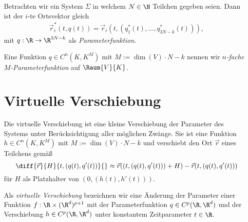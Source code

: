 \documentclass[../main.tex]{subfiles}
\begin{document}
	Betrachten wir ein System $\Sigma$ in welchem $N\in\N$ Teilchen gegeben seien. Dann ist der $i$-te Ortsvektor gleich 
	\begin{align*}
		\vec{r}_i^*(t,q(t))=\vec{r}_i(t,(q_1^*(t),\dots,q_{3N-k}^*(t))),
	\end{align*}
	mit $q:\R\to\R^{3N-k}$ als \emph{Parameterfunktion}. 
	\begin{info}
		Eine Funktion $q\in C^n(K,K^M)$ mit $M:=\dim(V)\cdot N-k$ nennen wir \emph{$n$-fache $M$-Parameterfunktion} auf $\Raum{V}{K}$.
	\end{info} 
	\section{Virtuelle Verschiebung}			
		Die virtuelle Verschiebung ist eine kleine Verschiebung der Parameter des Systems unter Berücksichtigung aller möglichen Zwänge. Sie ist eine Funktion $h\in C^n(K,K^M)$ mit $M:=\dim(V)\cdot N-k$ und verschiebt den Ort $\vec r$ eines Teilchens gemäß
		$$\diff{\vec r}{H}{t,(q(t),q'(t))}{}\approx\vec r((t,(q(t),q'(t)))+H)-\vec r(t,(q(t),q'(t)))$$
		für $H$ als Platzhalter von $(0,(h(t),h'(t)))$. 
		\begin{info}
			Als \emph{virtuelle Verschiebung} bezeichnen wir eine Änderung der Parameter einer Funktion $f:\R\times(\R^d)^{p+1}$ mit der Parameterfunktion $q\in C^p(\R,\R^d)$ und der Verschiebung $h\in C^p(\R,\R^d)$ unter konstantem Zeitparameter $t\in\R$. 
		\end{info}
		
\end{document}

